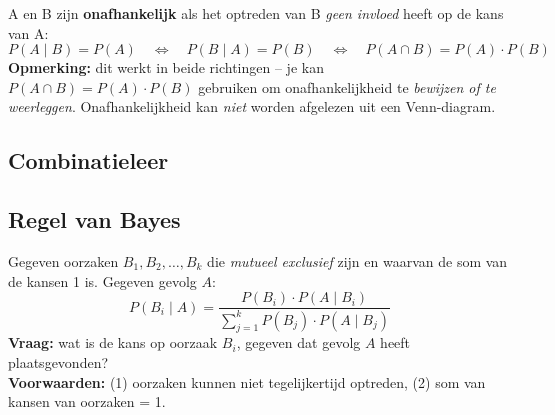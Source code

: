 \documentclass[a4paper,11pt]{article}
\begin{document}

\begin{conceptbox}
A en B zijn \textbf{onafhankelijk} als het optreden van B \emph{geen invloed} heeft op de kans van A:
\[P(A \mid B) = P(A) \quad\Leftrightarrow\quad P(B \mid A) = P(B) \quad\Leftrightarrow\quad P(A \cap B) = P(A) \cdot P(B)\]
\textbf{Opmerking:} dit werkt in beide richtingen -- je kan $P(A \cap B) = P(A) \cdot P(B)$ gebruiken om onafhankelijkheid te \emph{bewijzen of te weerleggen}. Onafhankelijkheid kan \emph{niet} worden afgelezen uit een Venn-diagram.
\end{conceptbox}

\subsection{Combinatieleer}





\subsection{Regel van Bayes}

\begin{theorieblok}
Gegeven oorzaken $B_1, B_2, \ldots, B_k$ die \emph{mutueel exclusief} zijn en waarvan de som van de kansen 1 is.
Gegeven gevolg $A$:
\[
  P(B_i \mid A) = \frac{P(B_i)\cdot P(A \mid B_i)}{\displaystyle\sum_{j=1}^{k} P(B_j)\cdot P(A \mid B_j)}
\]
\textbf{Vraag:} wat is de kans op oorzaak $B_i$, gegeven dat gevolg $A$ heeft plaatsgevonden?\\
\textbf{Voorwaarden:} (1) oorzaken kunnen niet tegelijkertijd optreden, (2) som van kansen van oorzaken = 1.
\end{theorieblok}
\end{document}
